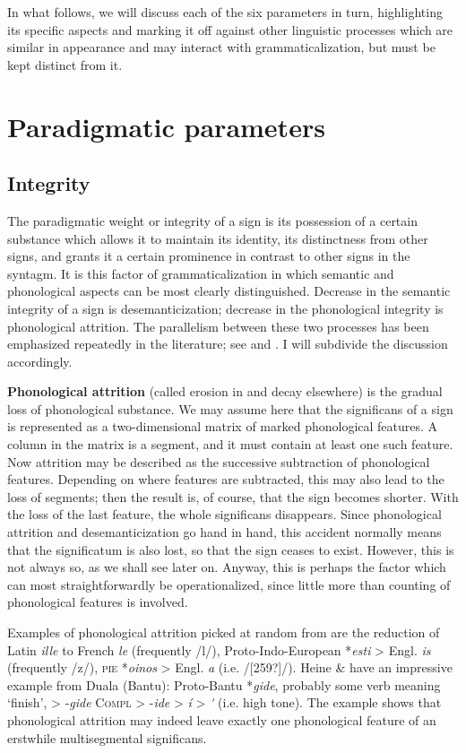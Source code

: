 In what follows, we will discuss each of the six parameters in turn, highlighting its specific aspects and marking it off against other linguistic processes which are similar in appearance and may interact with grammaticalization, but must be kept distinct from it.

\section{Paradigmatic parameters}
\subsection{Integrity} \label{sec:4.2.1}

The paradigmatic weight or integrity of a sign is its possession of a certain substance which allows it to maintain its identity, its distinctness from other signs, and grants it a certain prominence in contrast to other signs in the syntagm. It is this factor of grammaticalization in which semantic and phonological aspects can be most clearly distinguished. Decrease in the semantic integrity of a sign is desemanticization; decrease in the phonological integrity is phonological attrition. The parallelism between these two processes has been emphasized repeatedly in the literature; see \citet[135-139 ]{Meillet1912} and \citet[114-119]{Lehmann1974}. I will subdivide the discussion accordingly.

\textbf{Phonological attrition} (called erosion in \citet[21ff ]{HeineEtAl1984} and decay elsewhere) is the gradual loss of phonological substance. We may assume here that the significans of a sign is represented as a two-dimensional matrix of marked phonological features. A column in the matrix is a segment, and it must contain at least one such feature. Now attrition may be described as the successive subtraction of phonological features. Depending on where features are subtracted, this may also lead to the loss of segments; then the result is, of course, that the sign becomes shorter. With the loss of the last feature, the whole significans disappears. Since phonological attrition and desemanticization go hand in hand, this accident normally means that the significatum is also lost, so that the sign ceases to exist. However, this is not always so, as we shall see later on. Anyway, this is perhaps the factor which can most straightforwardly be operationalized, since little more than counting of phonological features is involved.

Examples of phonological attrition picked at random from  are the reduction of Latin \textit{ille} to French \textit{le} (frequently /l/), Proto-Indo-European *\textit{esti} {\textgreater} Engl. \textit{is} (frequently /z/), \textsc{pie} *\textit{oinos} {\textgreater} Engl. \textit{a} (i.e. /[259?]/). Heine \& \citet[25]{Reh1984} have an impressive example from Duala (Bantu): Proto-Bantu *\textit{gide}, probably some verb meaning ‘finish’, {\textgreater} -\textit{gide} \textsc{Compl} {\textgreater} -\textit{ide} {\textgreater} \textit{í} {\textgreater} \textit{\'{ }} (i.e. high tone). The example shows that phonological attrition may indeed leave exactly one phonological feature of an erstwhile multisegmental significans.

